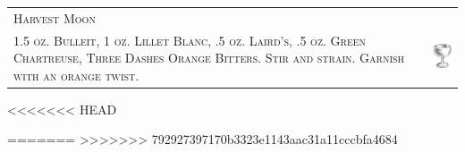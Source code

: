 \documentclass{article}
\begin{document}
\begin{tabular}{b{2.5in} m{0.625in}}
  \multicolumn{2}{p{3.0in}}{\centering\Huge\textsc{Harvest Moon}} \\ 
  
  \textsc{1.5 oz. Bulleit, 1 oz. Lillet Blanc, .5 oz. Laird's, .5 oz.
    Green Chartreuse, Three Dashes Orange Bitters. Stir and
    strain. Garnish with an orange twist.}  &
  \includegraphics[width=0.5in]{coupe.png}
\end{tabular}
<<<<<<< HEAD

=======
>>>>>>> 792927397170b3323e1143aac31a11cccbfa4684
\end{document}
